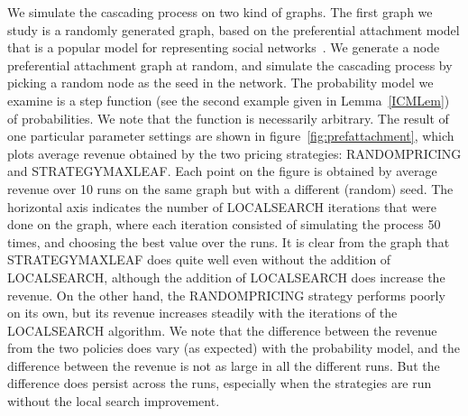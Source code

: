 \documentclass[letterpaper,twoside]{article}
\newcommand{\strategyml}{\textrm{S{\scriptsize TRATEGY}\-M{\scriptsize AX}\-L{\scriptsize EAF}}}
\newcommand{\LS}{\textrm{L{\scriptsize OCAL}\-S{\scriptsize EARCH}}}
\newcommand{\rand}{\textrm{R{\scriptsize ANDOM}\-P{\scriptsize RICING}}}
\begin{document}
\begin{figure*}[htpb]
  \centering
  \label{fig:revenue}
  \caption{The variation in revenue generated by \rand{} and \strategyml{} with
    the iterations of the \LS{} algorithm. The data is averaged over  runs
    of a  node random preferential attachment
    graph~ or a  node subgraph of
    YouTube~, starting with a random seed each time.}
\end{figure*}

We simulate the cascading process on two kind of graphs. The first graph we
study is a randomly generated graph, based on the preferential attachment
model that is a popular model for representing social
networks~\cite{NWS02}. We generate a  node preferential attachment
graph at random, and simulate the cascading process by picking a random node
as the seed in the network. The probability model we examine is a step
function (see the second example given in Lemma~\ref{ICMLem}) of
probabilities. We note that the function is necessarily arbitrary. The
result of one particular parameter settings are shown in
figure~\ref{fig:prefattachment}, which plots average revenue obtained by the
two pricing strategies: \rand{} and \strategyml. Each point on the figure is
obtained by average revenue over 10 runs on the same graph but with a
different (random) seed.  The horizontal axis indicates the number of \LS{}
iterations that were done on the graph, where each iteration consisted of
simulating the process 50 times, and choosing the best value over the
runs. It is clear from the graph that \strategyml{} does quite well even
without the addition of \LS{}, although the addition of \LS{} does increase
the revenue. On the other hand, the \rand{} strategy performs poorly on its
own, but its revenue increases steadily with the iterations of the \LS{}
algorithm. We note that the difference between the revenue from the two
policies does vary (as expected) with the probability model, and the
difference between the revenue is not as large in all the different runs. But
the difference does persist across the runs, especially when the strategies
are run without the local search improvement.
\end{document}
